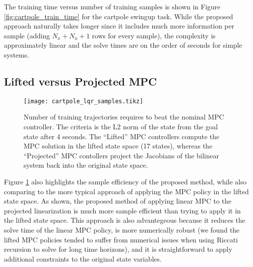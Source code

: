 \documentclass{article}
\begin{document}
The training time versus number of training samples is shown in Figure 
\ref{fig:cartpole_train_time} for the cartpole swingup task. While the proposed approach 
naturally takes longer since it includes much more information per sample (adding 
$N_x + N_u + 1$ rows for every sample), the complexity is approximately linear and the 
solve times are on the order of seconds for simple systems.


\subsection{Lifted versus Projected MPC}
\begin{figure}
  \centering
  \texttt{[image: cartpole\_lqr\_samples.tikz]}
  \caption{Number of training trajectories requires to beat the nominal MPC controller.
  The criteria is the L2 norm of the state from the goal state after 4 seconds.
  The ``Lifted'' MPC controllers compute the MPC solution in the lifted state space 
  (17 states), whereas the ``Projected'' MPC contollers project the Jacobians of the 
  bilinear system back into the original state space.
  }
  \label{fig:cartpole_lqr_samples}
\end{figure}
Figure \ref{fig:cartpole_lqr_samples} also highlights the sample efficiency of the proposed 
method, while also comparing to the more typical approach of applying the MPC policy in the 
lifted state space. As shown, the proposed method of applying linear MPC to the projected 
linearization is much more sample efficient than trying to apply it in the lifted state 
space. This approach is also advantegeous because it reduces the solve time of the linear 
MPC policy, is more numerically robust (we found the lifted MPC policies tended to suffer 
from numerical issues when using Riccati recursion to solve for long time horizons), and 
it is straightforward to apply additional constraints to the original state variables.

\end{document}
